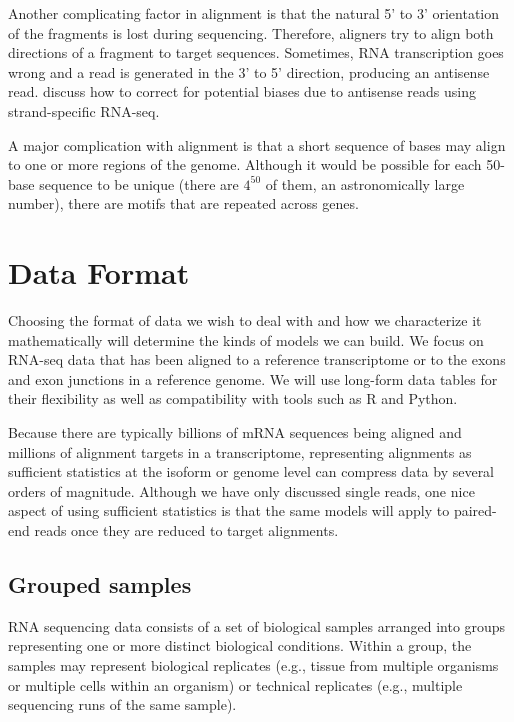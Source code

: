 \documentclass[11pt]{report}
\begin{document}
Another complicating factor in alignment is that the natural 5' to 3'
orientation of the fragments is lost during sequencing. Therefore,
aligners try to align both directions of a fragment to target
sequences. Sometimes, RNA transcription goes wrong and a read is
generated in the 3' to 5' direction, producing an antisense read.
\cite{mourao2019detection} discuss how to correct for potential biases
due to antisense reads using strand-specific RNA-seq.

A major complication with alignment is that a short sequence of bases
may align to one or more regions of the genome. Although it would be
possible for each 50-base sequence to be unique (there are $4^{50}$ of
them, an astronomically large number), there are motifs that are
repeated across genes.


\chapter{Data Format}

Choosing the format of data we wish to deal with and how we
characterize it mathematically will determine the kinds of models we
can build. We focus on RNA-seq data that has been aligned to a
reference transcriptome or to the exons and exon junctions in a
reference genome. We will use long-form data tables for their
flexibility as well as compatibility with tools such as R and Python.

Because there are typically billions of mRNA sequences being aligned
and millions of alignment targets in a transcriptome, representing
alignments as sufficient statistics at the isoform or genome level can
compress data by several orders of magnitude. Although we have only
discussed single reads, one nice aspect of using sufficient statistics
is that the same models will apply to paired-end reads once they are
reduced to target alignments.


\section{Grouped samples}

RNA sequencing data consists of a set of biological samples arranged
into groups representing one or more distinct biological conditions.
Within a group, the samples may represent biological replicates (e.g.,
tissue from multiple organisms or multiple cells within an organism)
or technical replicates (e.g., multiple sequencing runs of the same
sample).
\end{document}
